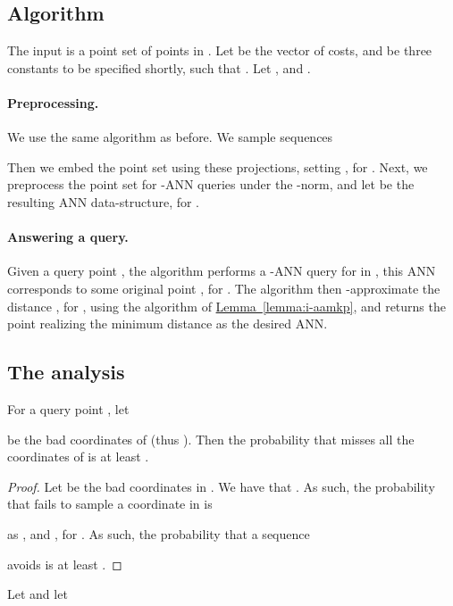 \documentclass[12pt]{article}\usepackage[cm]{fullpage}
\newcommand{\Term}[1]{\textsf{#1}}
\theoremstyle{remark}\theoremheaderfont{\sf}\theorembodyfont{\upshape}\newtheorem{defn}[theorem]{Definition}
\numberwithin{figure}{section}\numberwithin{table}{section}\numberwithin{equation}{section}
\newcommand{\HLink}[2]{\hyperref[#2]{#1~\ref*{#2}}}
\newcommand{\lemlab}[1]{\label{lemma:#1}}
\newcommand{\lemref}[1]{\HLink{Lemma}{lemma:#1}}
\newcommand{\ANN}{\Term{ANN}\xspace}\newcommand{\NN}{\Term{NN}\xspace}
\begin{document}
\subsection{Algorithm}

The input is a point set  of  points in .  Let
 be the vector of costs, and
 be three constants to be specified
shortly, such that .  Let
, and .

\paragraph{Preprocessing.}

We use the same algorithm as before.  We sample  sequences

Then we embed the point set using these projections, setting
, for . Next, we
preprocess the point set  for -\ANN queries under the
-norm, and let  be the resulting \ANN data-structure, for
.

\paragraph{Answering a query.} 

Given a query point , the algorithm performs a -\ANN query
for  in , this \ANN corresponds to some original
point , for . The algorithm
then -approximate the distance
, for ,
using the algorithm of \lemref{i-aamkp}, and returns the point
realizing the minimum distance as the desired \ANN. 

\subsection{The analysis}

\begin{lemma}
    \lemlab{budget:success} For a query point , let
    
    be the bad coordinates of  (thus
    ).  Then the probability that
     misses all the coordinates of
     is at least .
\end{lemma}

\begin{proof}
    Let  be the bad coordinates in . We
    have that . As such, the
    probability that  fails to sample
    a coordinate in  is
    
    as , and , for
    .  As such, the probability that a sequence
    
    avoids  is at least
    .
\end{proof}

Let  and let
\end{document}
